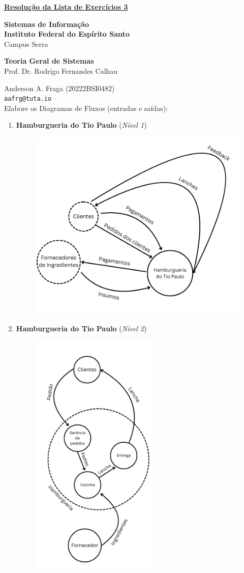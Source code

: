 \documentclass{article}
\begin{document}
\underline{\textbf{Resolução da Lista de Exercícios 3}}\par
\textbf{Sistemas de Informação}\\
\textbf{Instituto Federal do Espírito Santo}\\
Campus Serra\par
\textbf{Teoria Geral de Sistemas}\\
Prof. Dr. Rodrigo Fernandes Calhau\par
Anderson A. Fraga (20222BSI0482)\\
\texttt{aafrg@tuta.io}\\  %

Elabore os Diagramas de Fluxos (entradas e saídas):
\begin{enumerate}
    \item \textbf{Hamburgueria do Tio Paulo} (\textit{Nível 1})
    \begin{figure}[!h]
        \centering
        \includegraphics[width=11cm]{FIG/hamburgueria1.png}
    \end{figure}
    \pagebreak
    \item \textbf{Hamburgueria do Tio Paulo} (\textit{Nível 2})
    \begin{figure}[!h]
        \centering
        \includegraphics[width=6cm]{FIG/hamburgueria2.png}

\end{figure}
\end{enumerate}
\end{document}
